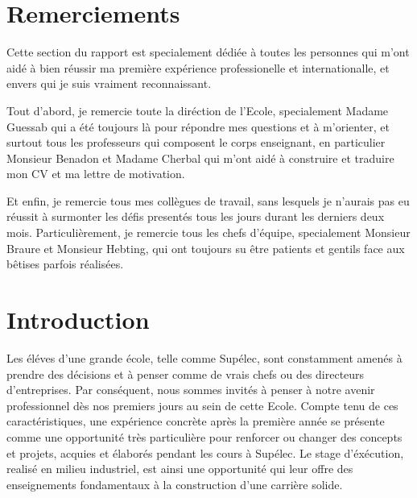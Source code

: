 \documentclass{article}
\begin{document}
\newpage
\tableofcontents

\newpage
\section*{Remerciements}

Cette section du rapport est specialement dédiée à toutes les personnes qui
m'ont aidé à bien réussir ma première expérience professionelle et
internationalle, et envers qui je suis vraiment reconnaissant.

\vspace{12pt}

Tout d'abord, je remercie toute la diréction de l'Ecole, specialement
Madame Guessab qui a été toujours là pour répondre mes questions et à
m'orienter, et surtout tous les professeurs qui composent le corps enseignant,
en particulier Monsieur Benadon et Madame Cherbal qui m'ont aidé à construire
et traduire mon CV et ma lettre de motivation.

\vspace{12pt}

Et enfin, je remercie tous mes collègues de travail, sans lesquels je
n'aurais pas eu réussit à surmonter les défis presentés tous les jours
durant les derniers deux mois. Particulièrement, je remercie tous les chefs
d'équipe, specialement Monsieur Braure et Monsieur Hebting, qui ont toujours su 
être patients et gentils face aux bêtises parfois réalisées.


\newpage
\section{Introduction}

Les éléves d'une grande école, telle comme Supélec, sont constamment amenés à
prendre des décisions et à penser comme de vrais chefs ou des directeurs
d'entreprises. Par conséquent, nous sommes invités à penser à notre avenir
professionnel dès nos premiers jours au sein de cette Ecole. Compte tenu de ces
caractéristiques, une expérience concrète après la première année se présente
comme une opportunité très particulière pour renforcer ou changer des concepts
et projets,  acquies et élaborés pendant les cours à Supélec. Le stage
d'éxécution, realisé en milieu industriel, est ainsi une opportunité qui leur
offre des enseignements fondamentaux à la construction d'une carrière solide.

\vspace{12pt}
\end{document}
